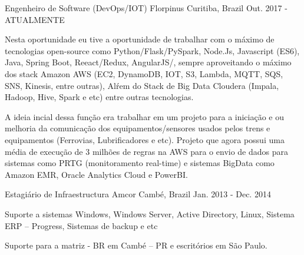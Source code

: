 

\begin{cventries}
\cventry
    { Engenheiro de Software (DevOps/IOT)} %
    {Florpinus} %
    {Curitiba, Brazil} %
    {Out. 2017 - ATUALMENTE} %
    {
    \begin{cvitems} %
       \item {Nesta oportunidade eu tive a oportunidade de trabalhar com o máximo de tecnologias open-source como Python/Flask/PySpark, Node.Js, Javascript (ES6), Java, Spring Boot, Reeact/Redux, AngularJS/, sempre aproveitando o máximo dos stack Amazon AWS (EC2, DynamoDB, IOT, S3, Lambda, MQTT, SQS, SNS, Kinesis, entre outras), Alŕem do Stack de Big Data Cloudera (Impala, Hadoop, Hive, Spark e etc) entre outras tecnologias. }
\item{ A ideia incial dessa função era trabalhar em um projeto para a iniciação e ou melhoria  da comunicação dos  equipamentos/sensores usados pelos trens e equipamentos (Ferrovias, Lubrificadores e etc). Projeto que agora possui uma média de execução de 3 milhões de regras na AWS  para o envio de dados para sistemas como PRTG (monitoramento real-time) e sistemas BigData como  Amazon EMR, Oracle Analytics Cloud e PowerBI.}
      \end{cvitems}
    }

  \cventry
    {Estagiário de Infraestructura} %
    {Amcor} %
    {Cambé, Brazil} %
    {Jan. 2013 - Dec. 2014} %
    {
      \begin{cvitems} %
        \item {Suporte a sistemas Windows, Windows Server, Active Directory, Linux, Sistema ERP – Progress, Sistemas de backup e etc}
        \item {Suporte para a matriz - BR em Cambé – PR e escritórios em São Paulo.}
      \end{cvitems}
    }

\end{cventries}
